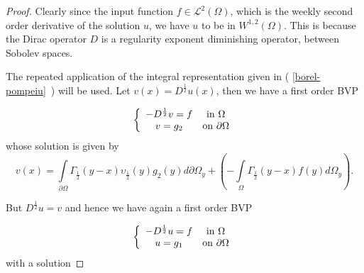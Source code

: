 \documentclass{amsart}%
\theoremstyle{plain}
\numberwithin{equation}{section}
\begin{document}
\begin{proof}
Clearly since the input function $f\in%
\mathcal{L}%
^{2}\left(  \Omega\right)  $, which is the weekly second order derivative of
the solution $u$, we have $u$ to be in $W^{1,2}\left(  \Omega\right)  $. This
is because the Dirac operator $D$ is a regularity exponent diminishing
operator, between Sobolev spaces.

The repeated application of the integral representation given in (
\ref{borel-pompeiu}\ ) will be used. Let $v\left(  x\right)  =D^{\frac{1}{2}%
}u(x)$, then we have a first order BVP%

\[
\left\{
\begin{array}
[c]{cc}%
-D^{\frac{1}{2}}v=f & \text{in }\Omega\\
v=g_{2} & \text{on }\partial\Omega
\end{array}
\right.
\]
whose solution is given by
\[
v(x)=%
{\displaystyle\int\limits_{\partial\Omega}}
\Gamma_{\frac{1}{2}}\left(  y-x\right)  \upsilon_{\frac{1}{2}}\left(
y\right)  g_{2}(y)d\partial\Omega_{y}+\left(  -%
{\displaystyle\int\limits_{\Omega}}
\Gamma_{\frac{1}{2}}\left(  y-x\right)  f(y)d\Omega_{y}\right)  \text{.}%
\]


But $D^{\frac{1}{2}}u=v$ and hence we have again a first order BVP%

\[
\left\{
\begin{array}
[c]{cc}%
-D^{\frac{1}{2}}u=f & \text{in }\Omega\\
u=g_{1} & \text{on }\partial\Omega
\end{array}
\right.
\]
with a solution%


\end{proof}
\end{document}
